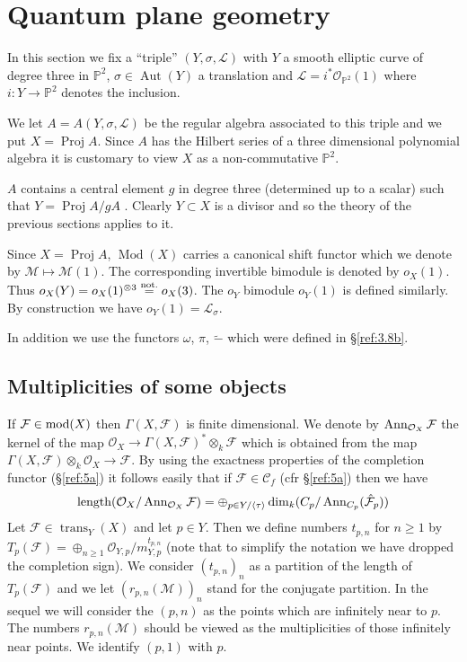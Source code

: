 \documentclass{amsproc}
\def \PP{{\mathbb P}}
\def\Cscr{{\mathcal C}}
\def\Fscr{{\mathcal F}}
\def\Lscr{{\mathcal L}}
\def\Mscr{{\mathcal M}}
\def\Oscr{{\mathcal O}}
\DeclareMathOperator{\Aut}{Aut}
\def\Ann{\mathop{\text{Ann}}\nolimits}
\def\mod{\mathop{\text{mod}}}
\def\trans{\operatorname{trans}}
\def\Proj{\operatorname {Proj}}
\def\Qch{\operatorname {Mod}}
\def\r{\rightarrow}
\let\oldtext\text
\def\text#1{\oldtext{\upshape #1}}
\DeclareMathOperator{\length}{length}
\theoremstyle{definition}
\theoremstyle{remark}
\numberwithin{equation}{section}
\numberwithin{table}{section}
\numberwithin{figure}{section}
\begin{document}
\section{Quantum plane geometry}
\label{ref:10a}
In this section we fix a ``triple'' $(Y,\sigma,\Lscr)$ with $Y$  
a smooth elliptic curve of degree three  in $\PP^2$,   $\sigma\in
\Aut(Y)$ a translation
and $\Lscr=i^\ast \Oscr_{\PP^2}(1)$ where $i:Y\r \PP^2$ denotes the
inclusion. 

We let $A=A(Y,\sigma,\Lscr)$ be the regular algebra associated to
this triple \cite{ATV1} and we put $X=\Proj A$. 
Since $A$ has the Hilbert series of a three dimensional polynomial
algebra it is customary to view $X$ as a non-commutative $\PP^2$.


$A$ contains a central element $g$ in degree three (determined up to a
scalar) such that $Y=\Proj A/gA$ \cite{ATV1,ATV2,AVdB}. Clearly
$Y\subset X$ is a divisor and so the theory of the
previous sections applies to it.

Since $X=\Proj A$, $\Qch(X)$ carries a canonical shift functor which
we denote by $\Mscr\mapsto \Mscr(1)$. The corresponding invertible bimodule is
denoted by $o_X(1)$. Thus  $o_X(Y)=o_X(1)^{\otimes 3}\overset{\text
{not.}}{=}
o_X(3)$. The $o_Y$ bimodule $o_Y(1)$ is defined similarly. By
construction we have $o_Y(1)=\Lscr_{\sigma}$. 

In addition we   use the functors
$\omega$, $\pi$,  $\tilde{-}$ which were defined in
\S\ref{ref:3.8b}. 


\subsection{Multiplicities of some objects}
If $\Fscr\in \mod(X)$  then $\Gamma(X,\Fscr)$ is
finite dimensional. We denote by $\Ann_{\Oscr_X} \Fscr$ the kernel of
the  map $\Oscr_X\r \Gamma(X,\Fscr)^\ast \otimes_k\Fscr$
which is obtained from the map $\Gamma(X,\Fscr)\otimes_k \Oscr_X\r
\Fscr$. By using the exactness properties of the completion functor
 (\S\ref{ref:5a}) it follows easily that if $\Fscr\in \Cscr_f$
(cfr \S\ref{ref:5a}) then we have
\begin{equation}
\label{ref:10.1a}
\length (\Oscr_X/\Ann_{\Oscr_X}\Fscr)=\oplus_{p\in Y/\langle\tau\rangle}
\dim_k(C_p/\Ann_{C_p}(\hat{\Fscr}_p)) 
\end{equation}
Let $\Fscr\in \trans_Y(X)$ and let $p\in Y$. Then we define numbers
$t_{p,n}$ for $n\ge 1$ by $T_p(\Fscr)=\oplus_{n\ge 1}
\Oscr_{Y,p}/m^{t_{p,n}}_{Y,p}$ (note that to simplify the notation we
have dropped the completion sign). We consider $(t_{p,n})_n$ as a
partition of the length of $T_p(\Fscr)$ and we let $(r_{p,n}(\Mscr))_n$ stand for
the conjugate partition.  In the sequel we will consider the $(p,n)$
as the points which are infinitely near to $p$. The numbers $r_{p,n}(\Mscr)$
should be viewed as the multiplicities of those infinitely near
points.  We identify $(p,1)$ with $p$.
\end{document}
